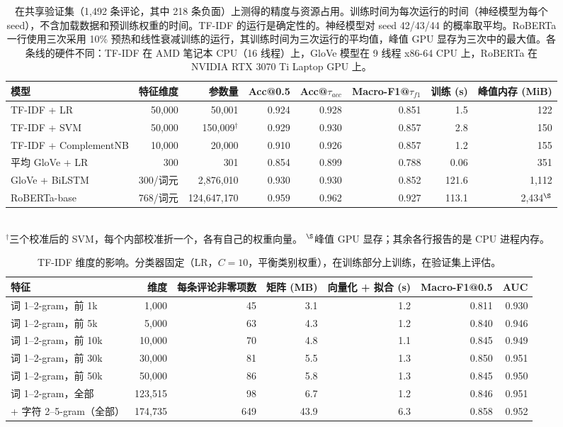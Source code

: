 \documentclass[11pt,a4paper]{article}
\begin{document}
\begin{table}[!htbp]
\centering
\caption{在共享验证集（1{,}492 条评论，其中 218 条负面）上测得的精度与资源占用。训练时间为每次运行的时间（神经模型为每个 seed），不含加载数据和预训练权重的时间。TF-IDF 的运行是确定性的。神经模型对 seed 42/43/44 的概率取平均。RoBERTa 一行使用三次采用 10\% 预热和线性衰减训练的运行，其训练时间为三次运行的平均值，峰值 GPU 显存为三次中的最大值。各条线的硬件不同：TF-IDF 在 AMD 笔记本 CPU（16 线程）上，GloVe 模型在 9 线程 x86-64 CPU 上，RoBERTa 在 NVIDIA RTX 3070 Ti Laptop GPU 上。}
\label{tab:g-measured}
\footnotesize
\setlength{\tabcolsep}{3pt}
\begin{tabular}{l r r r r r r r}
\toprule
模型 & 特征维度 & 参数量 & Acc@0.5 & Acc@$\tau_{acc}$ & Macro-F1@$\tau_{f1}$ & 训练 (s) & 峰值内存 (MiB) \\
\midrule
TF-IDF + LR            & 50{,}000 & 50{,}001  & 0.924 & 0.928 & 0.851 & 1.5 & 122 \\
TF-IDF + SVM     & 50{,}000 & 150{,}009$^{\dagger}$ & 0.929 & 0.930 & 0.857 & 2.8 & 150 \\
TF-IDF + ComplementNB  & 10{,}000 & 20{,}000  & 0.910 & 0.926 & 0.857 & 1.2 & 155 \\
平均 GloVe + LR & 300 & 301 & 0.854 & 0.899 & 0.788 & 0.06 & 351 \\
GloVe + BiLSTM & 300/词元 & 2{,}876{,}010 & 0.930 & 0.930 & 0.852 & 121.6 & 1{,}112 \\
RoBERTa-base & 768/词元 & 124{,}647{,}170 & 0.959 & 0.962 & 0.927 & 113.1 & 2{,}434$^{\S}$ \\
\bottomrule
\end{tabular}\\[2pt]
\footnotesize $^{\dagger}$三个校准后的 SVM，每个内部校准折一个，各有自己的权重向量。
$^{\S}$峰值 GPU 显存；其余各行报告的是 CPU 进程内存。
\end{table}

\begin{table}[!htbp]
\centering
\caption{TF-IDF 维度的影响。分类器固定（LR，$C{=}10$，平衡类别权重），在训练部分上训练，在验证集上评估。}
\label{tab:g-dims}
\footnotesize
\setlength{\tabcolsep}{3pt}
\begin{tabular}{l r r r r r r}
\toprule
特征 & 维度 & 每条评论非零项数 & 矩阵 (MB) & 向量化 + 拟合 (s) & Macro-F1@0.5 & AUC \\
\midrule
词 1--2-gram，前 1k   & 1{,}000   & 45  & 3.1  & 1.2 & 0.811 & 0.930 \\
词 1--2-gram，前 5k   & 5{,}000   & 63  & 4.3  & 1.2 & 0.840 & 0.946 \\
词 1--2-gram，前 10k  & 10{,}000  & 70  & 4.8  & 1.1 & 0.845 & 0.949 \\
词 1--2-gram，前 30k  & 30{,}000  & 81  & 5.5  & 1.3 & 0.850 & 0.951 \\
词 1--2-gram，前 50k  & 50{,}000  & 86  & 5.8  & 1.3 & 0.845 & 0.950 \\
词 1--2-gram，全部      & 123{,}515 & 98  & 6.7  & 1.2 & 0.846 & 0.951 \\
\quad + 字符 2--5-gram（全部） & 174{,}735 & 649 & 43.9 & 6.3 & 0.858 & 0.952 \\
\bottomrule
\end{tabular}
\end{table}
\end{document}
